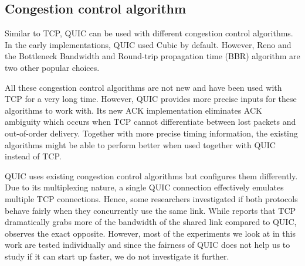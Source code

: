 \documentclass[conference]{IEEEtran}
\begin{document}
\subsection{Congestion control algorithm}

Similar to TCP, QUIC can be used with different congestion control algorithms. In the early implementations, QUIC used Cubic by default. However, Reno and the Bottleneck Bandwidth and Round-trip propagation time (BBR) algorithm are two other popular choices.

All these congestion control algorithms are not new and have been used with TCP for a very long time. However, QUIC provides more precise inputs for these algorithms to work with. Its new ACK implementation eliminates ACK ambiguity which occurs when TCP cannot differentiate between lost packets and out-of-order delivery. Together with more precise timing information, the existing algorithms might be able to perform better when used together with QUIC instead of TCP.

QUIC uses existing congestion control algorithms but configures them differently. Due to its multiplexing nature, a single QUIC connection effectively emulates multiple TCP connections. Hence, some researchers investigated if both protocols behave fairly when they concurrently use the same link. While \cite{Yu} reports that TCP dramatically grabs more of the bandwidth of the shared link compared to QUIC, \cite{Kakhki} observes the exact opposite. However, most of the experiments we look at in this work are tested individually and since the fairness of QUIC does not help us to study if it can start up faster, we do not investigate it further.


\end{document}
